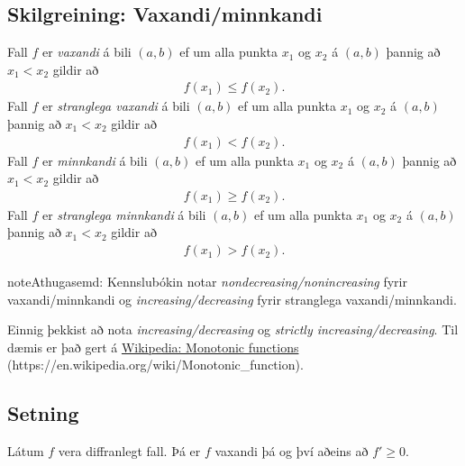 \documentclass[a4paper,10pt,icelandic]{sphinxmanual}
\begin{document}
\subsection{Skilgreining: Vaxandi/minnkandi}
\label{kafli03:index-9}\label{kafli03:skilgreining-vaxandi-minnkandi}
Fall \(f\) er \emph{vaxandi} á bili \((a,b)\) ef um
alla punkta \(x_1\) og \(x_2\) á \((a,b)\) þannig að
\(x_1 < x_2\) gildir að
\begin{equation*}
\begin{split}f(x_1) \leq f(x_2).\end{split}
\end{equation*}
Fall \(f\) er \emph{stranglega vaxandi} á bili \((a,b)\)
ef um alla punkta \(x_1\) og \(x_2\) á \((a,b)\) þannig að
\(x_1 < x_2\) gildir að
\begin{equation*}
\begin{split}f(x_1) < f(x_2).\end{split}
\end{equation*}
Fall \(f\) er \emph{minnkandi} á bili \((a,b)\) ef um
alla punkta \(x_1\) og \(x_2\) á \((a,b)\) þannig að
\(x_1 < x_2\) gildir að
\begin{equation*}
\begin{split}f(x_1) \geq f(x_2).\end{split}
\end{equation*}
Fall \(f\) er \emph{stranglega minnkandi} á bili
\((a,b)\) ef um alla punkta \(x_1\) og \(x_2\) á
\((a,b)\) þannig að \(x_1 < x_2\) gildir að
\begin{equation*}
\begin{split}f(x_1) > f(x_2).\end{split}
\end{equation*}
\begin{notice}{note}{Athugasemd:}
Kennslubókin notar \emph{nondecreasing/nonincreasing} fyrir vaxandi/minnkandi og
\emph{increasing/decreasing} fyrir stranglega vaxandi/minnkandi.

Einnig þekkist að nota \emph{increasing/decreasing} og \emph{strictly increasing/decreasing}.
Til dæmis er það gert á \href{https://en.wikipedia.org/wiki/Monotonic\_function}{Wikipedia: Monotonic functions} (https://en.wikipedia.org/wiki/Monotonic\_function).
\end{notice}


\subsection{Setning}
\label{kafli03:vaxandieoae}\label{kafli03:id15}
Látum \(f\) vera diffranlegt fall. Þá er \(f\) vaxandi þá og því
aðeins að \(f' \geq 0\).
\end{document}
